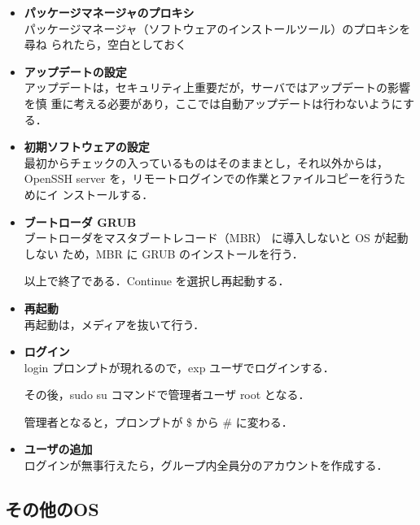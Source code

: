 \begin{itemize}
\item{\bf パッケージマネージャのプロキシ}\\

パッケージマネージャ（ソフトウェアのインストールツール）のプロキシを尋ね
られたら，空白としておく%

\item{\bf アップデートの設定}\\

アップデートは，セキュリティ上重要だが，サーバではアップデートの影響を慎
重に考える必要があり，ここでは自動アップデートは行わないようにする．

\item{\bf 初期ソフトウェアの設定}\\

最初からチェックの入っているものはそのままとし，それ以外からは，OpenSSH
     server を，リモートログインでの作業とファイルコピーを行うためにイ
     ンストールする．

\item{\bf ブートローダ GRUB}\\

ブートローダをマスタブートレコード（MBR） に導入しないと OS が起動しない
     ため，MBR に GRUB のインストールを行う．

以上で終了である．Continue を選択し再起動する．

\item{\bf 再起動}\\
再起動は，メディアを抜いて行う．

\item{\bf ログイン}\\
login プロンプトが現れるので，exp ユーザでログインする．

その後，sudo su コマンドで管理者ユーザ root となる．


管理者となると，プロンプトが \$ から \# に変わる．

\item{\bf ユーザの追加}\\
ログインが無事行えたら，グループ内全員分のアカウントを作成する．

\end{itemize}

\subsection{その他のOS}

